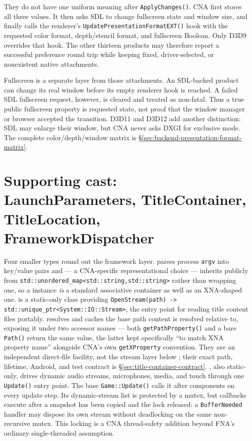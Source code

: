 They do not have one uniform meaning after \texttt{ApplyChanges()}. CNA first stores all
three values. It then asks SDL to change fullscreen state and window size, and finally calls
the renderer's \texttt{UpdatePresentationFormatEXT()} hook with the requested color format,
depth/stencil format, and fullscreen Boolean. Only D3D9 overrides that hook. The other
thirteen products may therefore report a successful preference round trip while keeping
fixed, driver-selected, or nonexistent native attachments.

Fullscreen is a separate layer from those attachments. An SDL-backed product can change its
real window before its empty renderer hook is reached. A failed SDL fullscreen request,
however, is cleared and treated as non-fatal. Thus a true public fullscreen property is
requested state, not proof that the window manager or browser accepted the transition.
D3D11 and D3D12 add another distinction: SDL may enlarge their window, but CNA never asks
DXGI for exclusive mode. The complete color/depth/window matrix is
\S\ref{sec:backend-presentation-format-matrix}.

\section{Supporting cast: LaunchParameters, TitleContainer, TitleLocation, FrameworkDispatcher}

Four smaller types round out the framework layer.  parses process
\texttt{argv} into key/value pairs and --- a CNA-specific representational choice --- inherits
publicly from \texttt{std::unordered\_map<std::string,std::string>} rather than wrapping one,
so a  instance \emph{is} a standard associative container as well
as an XNA-shaped one.  is a static-only class providing
\texttt{OpenStream(path) -> std::unique\_ptr<System::IO::Stream>}, the entry point for
reading title content files portably.  resolves and caches the base
path content is resolved relative to, exposing it under two accessor names --- both
\texttt{getPathProperty()} and a bare \texttt{Path()} return the same value, the latter kept
specifically ``to match XNA property name'' alongside CNA's own \texttt{getXProperty}
convention. They are an independent direct-file facility, not the stream layer below
; their exact path, lifetime, Android, and test contract is
\S\ref{sec:title-container-contract}. , also static-only, drives
dynamic audio streams, microphones, media, and touch through one \texttt{Update()} entry point.
The base \texttt{Game::Update()} calls it after components on every update step. Its dynamic-stream
list is protected by a mutex, but callbacks execute after a snapshot has been copied and the lock
released: a \texttt{BufferNeeded} handler may dispose its own stream without deadlocking on the
same non-recursive mutex. This locking is a CNA thread-safety addition beyond FNA's ordinary
single-threaded assumption.

